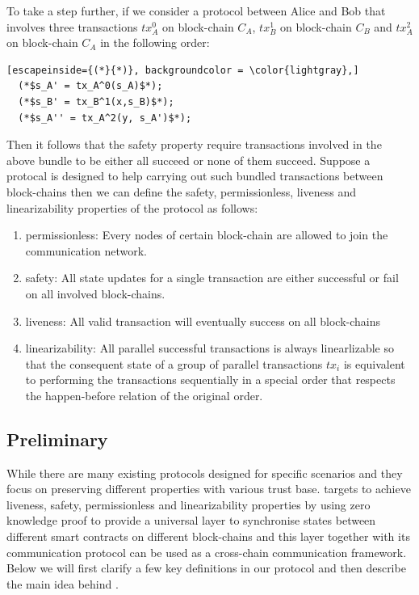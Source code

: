 \documentclass[pageno]{jpaper}
\begin{document}
To take a step further, if we consider a protocol between Alice and Bob that involves three transactions $tx_A^0$ on block-chain $C_A$, $tx_B^1$ on block-chain $C_B$ and $tx_A^2$ on block-chain $C_A$ in the following order:
\begin{lstlisting}[escapeinside={(*}{*)}, backgroundcolor = \color{lightgray},]
  (*$s_A' = tx_A^0(s_A)$*);
  (*$s_B' = tx_B^1(x,s_B)$*);
  (*$s_A'' = tx_A^2(y, s_A')$*);
\end{lstlisting}
Then it follows that the safety property require transactions involved in the above bundle to be either all succeed or none of them succeed. Suppose a protocal is designed to help carrying out such bundled transactions between block-chains then we can define the safety, permissionless, liveness and linearizability properties of the protocol as follows:

\begin{enumerate}[leftmargin=*]
\item permissionless: Every nodes of certain block-chain are allowed to join the communication network.
\item safety: All state updates for a single transaction are either successful or fail on all involved block-chains.
\item liveness: All valid transaction will eventually success on all block-chains
\item linearizability: All parallel successful transactions is always linearlizable so that the consequent state of a group of parallel transactions $tx_i$ is equivalent to performing the transactions sequentially in a special order that respects the happen-before relation of the original order.
\end{enumerate}

\subsection{Preliminary}
\label{prelimiary}
While there are many existing protocols designed for specific scenarios and they focus on preserving different properties with various trust base. \dprotocol targets to achieve liveness, safety, permissionless and linearizability properties by using zero knowledge proof to provide a universal layer to synchronise states between different smart contracts on different block-chains and this layer together with its communication protocol can be used as a cross-chain communication framework. Below we will first clarify a few key definitions in our protocol and then describe the main idea behind \dprotocol.
\\
\end{document}
